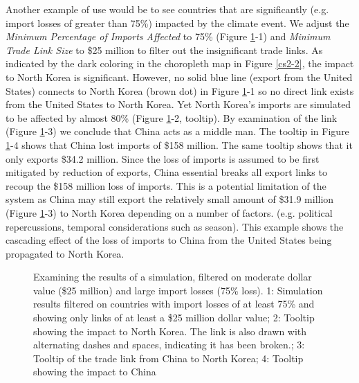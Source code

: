 Another example of use would be to see countries that are significantly (e.g. import losses of greater than 75\%) impacted by the climate event. We adjust the \textit{Minimum Percentage of Imports Affected} to 75\% (Figure \ref{cs2-4}-1) and \textit{Minimum Trade Link Size} to \$25 million to filter out the insignificant trade links. As indicated by the dark coloring in the choropleth map in Figure \ref{cs2-2}, the impact to North Korea is significant. However, no solid blue line (export from the United States) connects to North Korea (brown dot) in Figure \ref{cs2-4}-1 so no direct link exists from the United States to North Korea. Yet North Korea's imports are simulated to be affected by almost 80\% (Figure \ref{cs2-4}-2, tooltip). By examination of the link (Figure \ref{cs2-4}-3) we conclude that China acts as a middle man. The tooltip in Figure \ref{cs2-4}-4 shows that China lost imports of \$158 million. The same tooltip shows that it only exports \$34.2 million. Since the loss of imports is assumed to be first mitigated by reduction of exports, China essential breaks all export links to recoup the \$158 million loss of imports. This is a potential limitation of the system as China may still export the relatively small amount of \$31.9 million (Figure \ref{cs2-4}-3) to North Korea depending on a number of factors. (e.g. political repercussions, temporal considerations such as season). This example shows the cascading effect of the loss of imports to China from the United States being propagated to North Korea.\par
\begin{figure}[htb]
	\caption[EXAMINING THE RESULTS OF A SIMULATION, FILTERED ON MODERATE DOLLAR VALUE (\$25 MILLION) AND LARGE IMPORT LOSSES (75\% LOSS)]{Examining the results of a simulation, filtered on moderate dollar value (\$25 million) and large import losses (75\% loss). 1: {Simulation results filtered on countries with import losses of at least 75\% and showing only links of at least a \$25 million dollar value}; 2: {Tooltip showing the impact to North Korea. The link is also drawn with alternating dashes and spaces, indicating it has been broken.}; 3: {Tooltip of the trade link from China to North Korea}; 4: {Tooltip showing the impact to China} }
	\label{cs2-4}
\end{figure}
